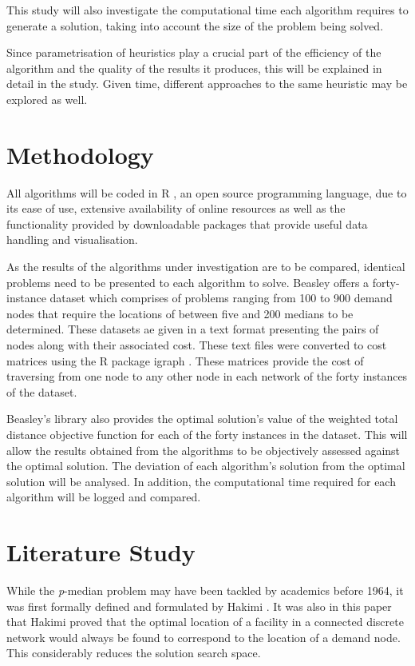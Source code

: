 \documentclass[11pt]{article}
\begin{document}
	This study will also investigate the computational time each algorithm requires to generate a solution, taking into account the size of the problem being solved.
	
	Since parametrisation of heuristics play a crucial part of the efficiency of the algorithm and the quality of the results it produces, this will be explained in detail in the study.  Given time, different approaches to the same heuristic may be explored as well.	
	
	
	\section{Methodology}
	All algorithms will be coded in R \cite{RPROGRAMME}, an open source programming language, due to its ease of use, extensive availability of online resources as well as the functionality provided by downloadable packages that provide useful data handling and visualisation.
	
	As the results of the algorithms under investigation are to be compared, identical problems need to be presented to each algorithm to solve.  Beasley \cite{BEAS90}  offers a forty-instance dataset which comprises of problems ranging from 100 to 900 demand nodes that require the locations of between five and 200 medians to be determined.  These datasets ae given in a text format presenting the pairs of nodes along with their associated cost.  These text files were converted to cost matrices using the R package igraph \cite{RIGRAPH}.  These matrices provide the cost of traversing from one node to any other node in each network of the forty instances of the dataset.
	
	Beasley's library also provides the optimal solution's value of the weighted total distance objective function for each of the forty instances in the dataset.  This will allow the results obtained from the algorithms to be objectively assessed against the optimal solution.  The deviation of each algorithm's solution from the optimal solution will be analysed.  In addition, the computational time required for each algorithm will be logged and compared.
	

	\section{Literature Study}
	While the \emph{p}-median problem may have been tackled by academics before 1964, it was first formally defined and formulated by Hakimi \cite{HAKI64}.  It was also in this paper that Hakimi proved that the optimal location of a facility in a connected discrete network would always be found to correspond to the location of a demand node.  This considerably reduces the solution search space.
	
\end{document}
